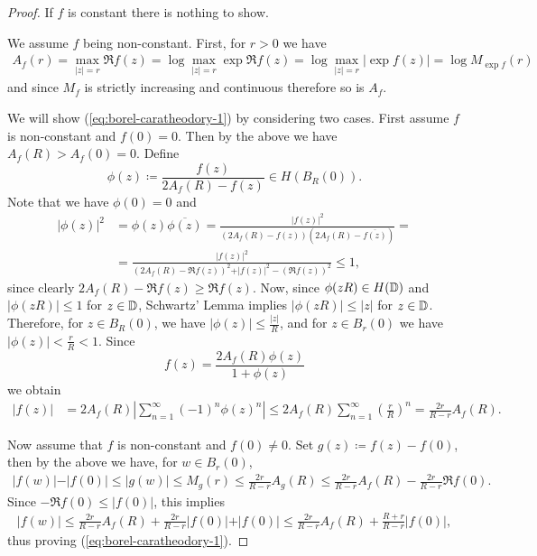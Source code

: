 \begin{proof}
    If $f$ is constant there is nothing to show.

    We assume $f$ being non-constant. First, for $r > 0$ we have
    \begin{align*}
        A_f(r) = \max_{\vert z \vert = r} \Re f(z) = \log \max_{\vert z \vert = r} \exp {\Re f(z)} = \log \max_{\vert z \vert = r} \vert \exp f(z) \vert = \log M_{\exp f}(r)
    \end{align*}
    and since $M_f$ is strictly increasing and continuous therefore so is $A_f$.

    We will show (\ref{eq:borel-caratheodory-1}) by considering two cases. First assume $f$ is non-constant and $f(0) = 0$. Then by the above we have $A_f(R) > A_f(0) = 0$. Define
    \begin{equation*}
        \phi(z) \coloneqq \frac{f(z)}{2 A_f(R) - f(z)} \in H(B_R(0)).
    \end{equation*}
    Note that we have $\phi(0) = 0$ and
    \begin{align*}
        \vert \phi(z) \vert^2 &= \phi(z) \overline{\phi(z)} = \frac{\vert f(z) \vert^2}{(2 A_f(R) - f(z))(2 A_f(R) - \overline{f(z)})} = \\
        &= \frac{\vert f(z) \vert^2}{(2 A_f(R) - \Re f(z))^2 + \vert f(z) \vert^2 - (\Re f(z))^2} \leq 1,
    \end{align*}
    since clearly $2 A_f(R) - \Re f(z) \geq \Re f(z)$. Now, since $\phi(zR) \in H(\mathbb{D})$ and $\vert \phi(zR) \vert \leq 1$ for $z \in \mathbb{D}$, Schwartz' Lemma implies $\vert \phi(zR) \vert \leq \vert z \vert$ for $z \in \mathbb{D}$. Therefore, for $z \in B_R(0)$, we have $\vert \phi (z) \vert \leq \frac{\vert z \vert}{R}$, and for $z \in B_r(0)$ we have $\vert \phi (z) \vert < \frac{r}{R} < 1$. Since
    \begin{equation*}
        f(z) = \frac{2 A_f(R) \phi(z)}{1 + \phi(z)}
    \end{equation*}
    we obtain
    \begin{align*}
        \vert f(z) \vert &= 2 A_f(R) \left\vert \sum_{n=1}^\infty (-1)^n \phi(z)^n \right\vert \leq 2 A_f(R) \sum_{n=1}^\infty \left( \frac{r}{R} \right)^n = \frac{2 r}{R - r} A_f(R).
    \end{align*}

    Now assume that $f$ is non-constant and $f(0) \neq 0$. Set $g(z) \coloneqq f(z) - f(0)$, then by the above we have, for $w \in B_r(0)$,
    \begin{align*}
        \vert f(w) \vert - \vert f(0) \vert \leq \vert g(w) \vert \leq M_g(r) \leq \frac{2 r}{R - r} A_g(R) \leq \frac{2r}{R - r} A_f(R) - \frac{2r}{R - r} \Re f(0).
    \end{align*}
    Since $-\Re f(0) \leq \vert f(0) \vert$, this implies
    \begin{align*}
        \vert f(w) \vert \leq \frac{2r}{R - r}A_f(R) + \frac{2r}{R - r} \vert f(0) \vert + \vert f(0) \vert \leq \frac{2r}{R - r} A_f(R) + \frac{R + r}{R - r} \vert f(0) \vert,
    \end{align*}
    thus proving (\ref{eq:borel-caratheodory-1}).


\end{proof}
